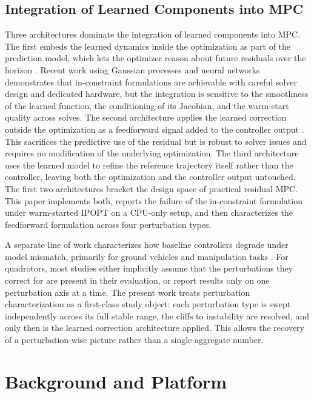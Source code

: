 \documentclass[conference]{IEEEtran}
\begin{document}
\subsection{Integration of Learned Components into MPC}
Three architectures dominate the integration of learned components into MPC. The first embeds the learned dynamics inside the optimization as part of the prediction model, which lets the optimizer reason about future residuals over the horizon \cite{torrente2021data, salzmann2023real}. Recent work using Gaussian processes \cite{hewing2018cautious} and neural networks \cite{salzmann2023real} demonstrates that in-constraint formulations are achievable with careful solver design and dedicated hardware, but the integration is sensitive to the smoothness of the learned function, the conditioning of its Jacobian, and the warm-start quality across solves. The second architecture applies the learned correction outside the optimization as a feedforward signal added to the controller output \cite{shi2019neural}. This sacrifices the predictive use of the residual but is robust to solver issues and requires no modification of the underlying optimization. The third architecture uses the learned model to refine the reference trajectory itself rather than the controller, leaving both the optimization and the controller output untouched. The first two architectures bracket the design space of practical residual MPC. This paper implements both, reports the failure of the in-constraint formulation under warm-started IPOPT on a CPU-only setup, and then characterizes the feedforward formulation across four perturbation types.

A separate line of work characterizes how baseline controllers degrade under model mismatch, primarily for ground vehicles \cite{kabzan2019learning} and manipulation tasks \cite{nguyen2011model}. For quadrotors, most studies either implicitly assume that the perturbations they correct for are present in their evaluation, or report results only on one perturbation axis at a time. The present work treats perturbation characterization as a first-class study object: each perturbation type is swept independently across its full stable range, the cliffs to instability are resolved, and only then is the learned correction architecture applied. This allows the recovery of a perturbation-wise picture rather than a single aggregate number.


\section{Background and Platform}
\end{document}
